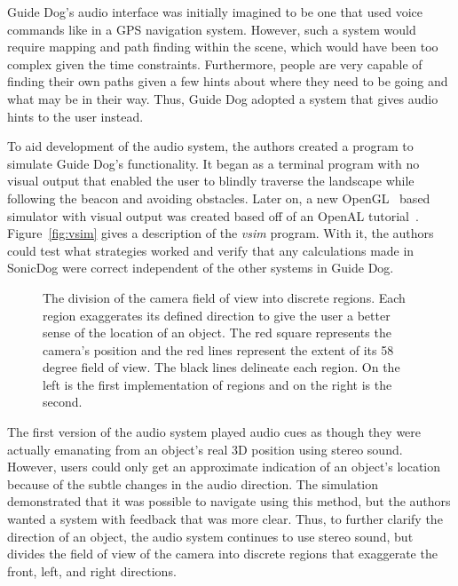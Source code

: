 Guide Dog's audio interface was initially imagined to be one that used voice
commands like in a GPS navigation system. However, such a system would require
mapping and path finding within the scene, which would have been too complex
given the time constraints. Furthermore, people are very capable of finding
their own paths given a few hints about where they need to be going and what
may be in their way. Thus, Guide Dog adopted a system that gives audio hints to
the user instead.

To aid development of the audio system, the authors created a program to
simulate Guide Dog's functionality. It began as a terminal program with no
visual output that enabled the user to blindly traverse the landscape while
following the beacon and avoiding obstacles. Later on, a new OpenGL~\cite{opengl-website} based simulator with
visual output was created based off of an OpenAL tutorial~\cite{openal-tutorial}.
Figure~\ref{fig:vsim} gives a description of the
\emph{vsim} program. With it, the authors could test what strategies worked and
verify that any calculations made in SonicDog were correct independent of the
other systems in Guide Dog.

\begin{figure}
\caption{The division of the camera field of view into discrete regions. Each
region exaggerates its defined direction to give the user a better sense of the
location of an object. The red square represents the camera's position and the
red lines represent the extent of its 58 degree field of view. The black lines
delineate each region. On the left is the first implementation of regions and
on the right is the second.}
\label{fig:regions}
\end{figure}

The first version of the audio system played audio cues as though they were
actually emanating from an object's real 3D position using stereo sound. However,
users could only get an approximate indication of an object's location because
of the subtle changes in the audio direction. The simulation demonstrated that
it was possible to navigate using this method, but the authors wanted a system
with feedback that was more clear. Thus, to further clarify the direction of an 
object, the audio system continues to use stereo sound, but divides the field of
view of the camera into discrete regions that exaggerate the front, left, and 
right directions.

